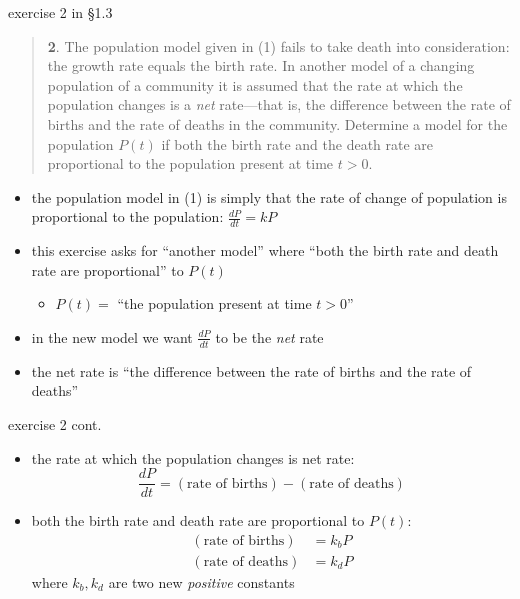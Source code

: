 \documentclass{beamer}
\begin{document}
\begin{frame}{exercise 2 in \S 1.3}

\scriptsize
\begin{quotation}
\noindent \textbf{2}.  The population model given in (1) fails to take death into consideration: the growth rate equals the birth rate.  In another model of a changing population of a community it is assumed that the rate at which the population changes is a \emph{net} rate---that is, the difference between the rate of births and the rate of deaths in the community.  Determine a model for the population $P(t)$ if both the birth rate and the death rate are proportional to the population present at time $t>0$.
\end{quotation}

\small
\vspace{-3mm}

\begin{itemize}
\item the population model in (1) is simply that the rate of change of population is proportional to the population: $\frac{dP}{dt} = k P$
\item this exercise asks for ``another model'' where ``both the birth rate and death rate are proportional'' to $P(t)$
    \begin{itemize}
    \item $P(t) =$ ``the population present at time $t>0$''
    \end{itemize}
\item in the new model we want $\frac{dP}{dt}$ to be the \emph{net} rate
\item the net rate is ``the difference between the rate of births and the rate of deaths''
\end{itemize}
\end{frame}


\begin{frame}{exercise 2 cont.}

\begin{itemize}
\item the rate at which the population changes is net rate:
    $$\frac{dP}{dt} = (\text{rate of births}) - (\text{rate of deaths})$$
\item both the birth rate and death rate are proportional to $P(t)$:
\begin{align*}
    (\text{rate of births}) &= k_b P \\
    (\text{rate of deaths}) &= k_d P
\end{align*}
where $k_b,k_d$ are two new \emph{positive} constants
\end{itemize}
\end{frame}
\end{document}
